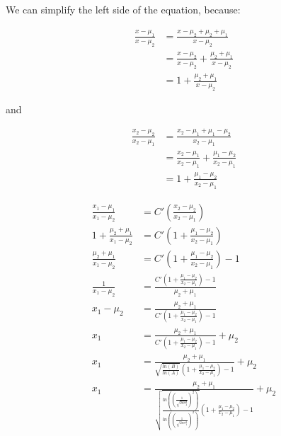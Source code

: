 \documentclass[10pt,a4paper]{article}
\begin{document}
	We can simplify the left side of the equation, because:
	
	\begin{align*}
		\frac{x-\mu_1}{x-\mu_2} &= \frac{x-\mu_2+\mu_2+\mu_1}{x-\mu_2}\\
		&= \frac{x-\mu_2}{x-\mu_2}+\frac{\mu_2+\mu_1}{x-\mu_2}\\
		&= 1 + \frac{\mu_2+\mu_1}{x-\mu_2}
	\end{align*}
	
	and
	
	\begin{align*}
	\frac{x_2-\mu_2}{x_2-\mu_1} &= \frac{x_2-\mu_1+\mu_1-\mu_2}{x_2-\mu_1}\\
	&= \frac{x_2-\mu_1}{x_2-\mu_1}+\frac{\mu_1-\mu_2}{x_2-\mu_1}\\
	&= 1 +\frac{\mu_1-\mu_2}{x_2-\mu_1}
	\end{align*}
	
	\begin{align*}
	\frac{x_1-\mu_1}{x_1-\mu_2} &= C'(\frac{x_2-\mu_2}{x_2-\mu_1})\\
	1 + \frac{\mu_2+\mu_1}{x_1-\mu_2} &= C'(1 +\frac{\mu_1-\mu_2}{x_2-\mu_1})\\
	\frac{\mu_2+\mu_1}{x_1-\mu_2} &= C'(1 +\frac{\mu_1-\mu_2}{x_2-\mu_1}) - 1\\
	\frac{1}{x_1-\mu_2} &=\frac{C'(1 +\frac{\mu_1-\mu_2}{x_2-\mu_1}) - 1}{\mu_2+\mu_1}\\
	x_1-\mu_2 &=\frac{\mu_2+\mu_1}{C'(1 +\frac{\mu_1-\mu_2}{x_2-\mu_1}) - 1}\\
	x_1 &=\frac{\mu_2+\mu_1}{C'(1 +\frac{\mu_1-\mu_2}{x_2-\mu_1}) - 1} + \mu_2\\
	x_1 &=\frac{\mu_2+\mu_1}{\sqrt{\frac{ln(B)}{ln(A)}}(1 +\frac{\mu_1-\mu_2}{x_2-\mu_1}) - 1} + \mu_2\\
	x_1 &=\frac{\mu_2+\mu_1}{\sqrt{\frac{ln( (\frac{1}{\sqrt{2\pi\sigma_2^2}})^2)}{ln((\frac{1}{\sqrt{2\pi\sigma_1^2}})^2)}}(1 +\frac{\mu_1-\mu_2}{x_2-\mu_1}) - 1} + \mu_2\\
	\end{align*}
	
\end{document}
